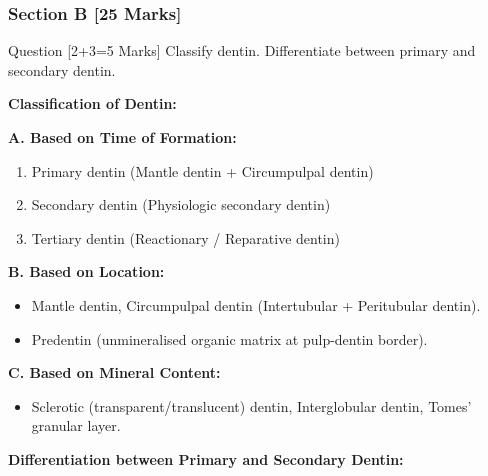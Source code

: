 \documentclass[11pt,a4paper]{article}
\begin{document}
\subsubsection{Section B [25 Marks]}

\begin{qbox}{Question [2+3=5 Marks]}
Classify dentin. Differentiate between primary and secondary dentin.
\end{qbox}

\begin{ansbox}
\textbf{Classification of Dentin:}

\textbf{A. Based on Time of Formation:}
\begin{enumerate}[leftmargin=*]
    \item Primary dentin (Mantle dentin + Circumpulpal dentin)
    \item Secondary dentin (Physiologic secondary dentin)
    \item Tertiary dentin (Reactionary / Reparative dentin)
\end{enumerate}

\textbf{B. Based on Location:}
\begin{itemize}[leftmargin=*]
    \item Mantle dentin, Circumpulpal dentin (Intertubular + Peritubular dentin).
    \item Predentin (unmineralised organic matrix at pulp-dentin border).
\end{itemize}

\textbf{C. Based on Mineral Content:}
\begin{itemize}[leftmargin=*]
    \item Sclerotic (transparent/translucent) dentin, Interglobular dentin, Tomes' granular layer.
\end{itemize}

\textbf{Differentiation between Primary and Secondary Dentin:}


\end{ansbox}
\end{document}
